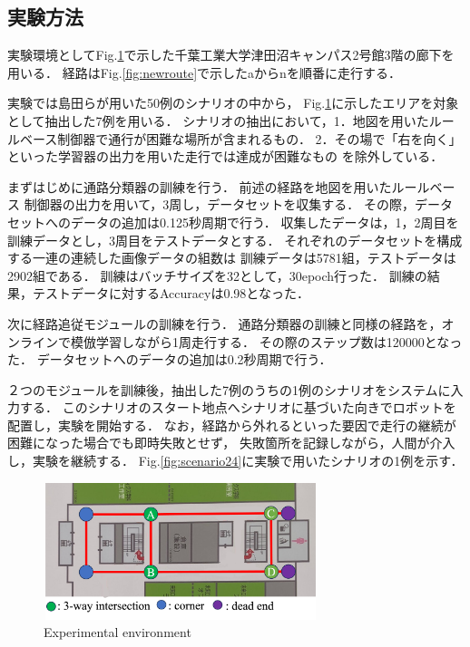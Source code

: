 \documentclass{sice-si}
\begin{document}
\subsection{実験方法}
実験環境としてFig.\ref{fig:cit3f}で示した千葉工業大学津田沼キャンパス2号館3階の廊下を用いる．
経路はFig.\ref{fig:newroute}で示したaからnを順番に走行する．\par
実験では島田らが用いた50例のシナリオの中から，
Fig.\ref{fig:cit3f}に示したエリアを対象として抽出した7例を用いる．
シナリオの抽出において，1．地図を用いたルールベース制御器で通行が困難な場所が含まれるもの．
2．その場で「右を向く」といった学習器の出力を用いた走行では達成が困難なもの
を除外している．\par
まずはじめに通路分類器の訓練を行う．
前述の経路を地図を用いたルールベース
制御器の出力を用いて，3周し，データセットを収集する．
その際，データセットへのデータの追加は0.125秒周期で行う．
収集したデータは，1，2周目を訓練データとし，3周目をテストデータとする．
それぞれのデータセットを構成する一連の連続した画像データの組数は
訓練データは5781組，テストデータは2902組である．
訓練はバッチサイズを32として，30epoch行った．
訓練の結果，テストデータに対するAccuracyは0.98となった．\par
次に経路追従モジュールの訓練を行う．
通路分類器の訓練と同様の経路を，オンラインで模倣学習しながら1周走行する．
その際のステップ数は120000となった．
データセットへのデータの追加は0.2秒周期で行う．\par
２つのモジュールを訓練後，抽出した7例のうちの1例のシナリオをシステムに入力する．
このシナリオのスタート地点へシナリオに基づいた向きでロボットを配置し，実験を開始する．
なお，経路から外れるといった要因で走行の継続が困難になった場合でも即時失敗とせず，
失敗箇所を記録しながら，人間が介入し，実験を継続する．
Fig.\ref{fig:scenario24}に実験で用いたシナリオの1例を示す．
\begin{figure}[htbp]
    \centering
     \includegraphics[height=40mm,width=80mm]{./figs/cit3f.png}
     \caption{Experimental environment}\label{fig:cit3f}
\end{figure}
\end{document}
